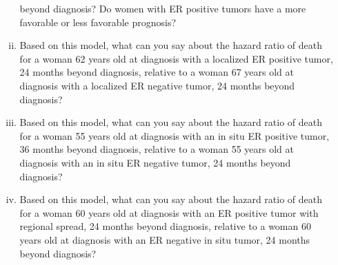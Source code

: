 \begin{enumerate}[(a)]
\begin{enumerate}[(i)]
beyond diagnosis? Do women with ER positive tumors have a more favorable or
less favorable prognosis?
\item Based on this model, what can you say about the hazard ratio of death for a
woman 62 years old at diagnosis with a localized ER positive tumor, 24 months
beyond diagnosis, relative to a woman 67 years old at diagnosis with a localized
ER negative tumor, 24 months beyond diagnosis?
\item Based on this model, what can you say about the hazard ratio of death for a
woman 55 years old at diagnosis with an in situ ER positive tumor, 36 months
beyond diagnosis, relative to a woman 55 years old at diagnosis with an in situ ER
negative tumor, 24 months beyond diagnosis?
\item Based on this model, what can you say about the hazard ratio of death for a
woman 60 years old at diagnosis with an ER positive tumor with regional spread,
24 months beyond diagnosis, relative to a woman 60 years old at diagnosis with
an ER negative in situ tumor, 24 months beyond diagnosis?
\end{enumerate}


\end{enumerate}
